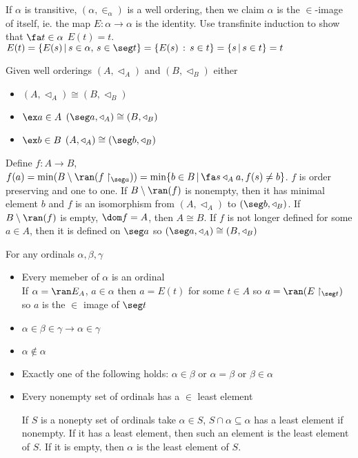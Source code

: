 \begin{pf}
    If $\alpha$ is transitive, $(\alpha, \in_{\alpha})$ is a well ordering, then we claim $\alpha$ is the $\in$-image of itself, ie. the map $E: \alpha \to \alpha$ is the identity. Use transfinite induction to show that $\fa t \in \alpha$ $E(t)=t$. $E(t) = \{E(s) \, | \, s \in \alpha,\, s \in \seg t\} = \{E(s) \, : \, s \in t\} = \{s \, | \, s \in t \} = t$ 
\end{pf}

\begin{theorem}
    Given well orderings $(A, \triangleleft_A)$ and $(B, \triangleleft_B)$ either 
    \begin{itemize}
        \item $(A, \triangleleft_A) \cong (B, \triangleleft_B)$ 
        \item $\ex a \in A$ $(\seg a, \triangleleft_A) \cong (B, \triangleleft_B)$ 
        \item $\ex b \in B$ $(A, \triangleleft_A) \cong (\seg b, \triangleleft_B)$
    \end{itemize}
\end{theorem}

\begin{pf}
    Define $f: A \to B$, $f(a) = \min(B \setminus \ran(f \upharpoonright_{\seg a})) = \min \{b \in B \, | \, \fa s \triangleleft_A a, f(s) \neq b \}$. $f$ is order preserving and one to one. If $B \setminus \ran (f)$ is nonempty, then it has minimal element $b$ and $f$ is an isomorphism from $(A, \triangleleft_A)$ to $(\seg b , \triangleleft_B)$. If $B \setminus \ran(f)$ is empty, $\dom f = A$, then $A \cong B$. If $f$ is not longer defined for some $a \in A$, then it is defined on $\seg a$ so $(\seg a , \triangleleft_A) \cong (B, \triangleleft_B)$ 
\end{pf}

\begin{theorem}
    For any ordinals $\alpha, \beta, \gamma$ 
    \begin{itemize}
        \item Every memeber of $\alpha$ is an ordinal \\
        If $\alpha = \ran E_A$, $a \in \alpha$ then $a = E(t)$ for some $t \in A$ so $a = \ran (E \upharpoonright_{\seg t})$ so $a$ is the $\in$ image of $\seg t$ 
        \item $\alpha \in \beta \in \gamma \to \alpha \in \gamma$ 
        \item $\alpha \not\in \alpha$ 
        \item Exactly one of the following holds: $\alpha \in \beta$ or $\alpha = \beta$ or $\beta \in \alpha$ 
        \item Every nonempty set of ordinals has a $\in$ least element 
        \begin{pf}
            If $S$ is a nonepty set of ordinals take $\alpha \in S$, $S \cap \alpha \subseteq \alpha$ has a least element if nonempty. If it has a least element, then such an element is the least element of $S$. If it is empty, then $\alpha$ is the least element of $S$. 
        \end{pf}
    \end{itemize}
\end{theorem}

